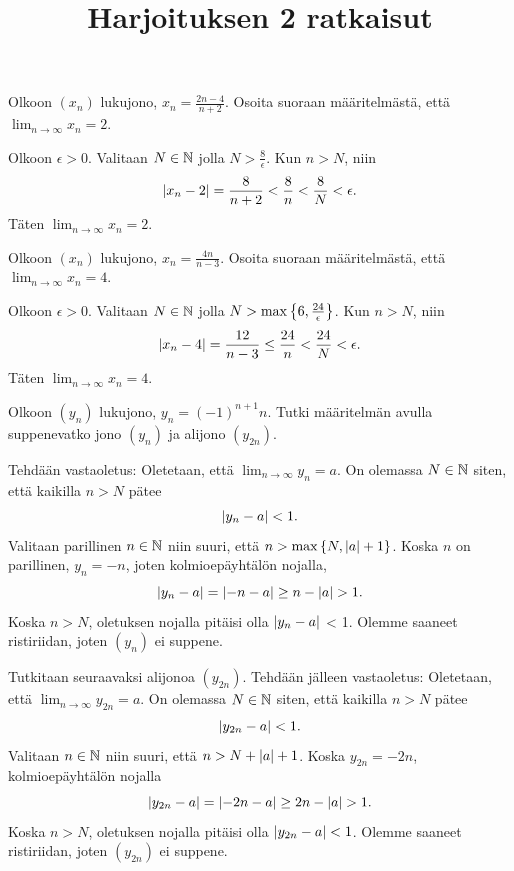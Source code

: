 \documentclass[12pt,a4paper]{article}
\title{Harjoituksen 2 ratkaisut}
\author{}
\date{}
\begin{document}
\maketitle

\noindent

\begin{exercise}
  Olkoon \((x_n)\) lukujono, \(x_n = \frac{2n - 4}{n + 2}\). Osoita suoraan
  määritelmästä, että \(\lim_{n \to \infty} x_n = 2\).
\end{exercise}

\begin{solution}
  Olkoon \(\epsilon > 0\). Valitaan \(N \in \mathbb{N}\) jolla \(N >
  \frac{8}{\epsilon}\). Kun \(n > N\), niin
  \[
    \lvert x_n - 2\rvert = \frac{8}{n + 2} < \frac{8}{n} < \frac{8}{N} < \epsilon.
  \]
  Täten \(\lim_{n \to \infty} x_n = 2\).
\end{solution}

\begin{exercise}
  Olkoon \((x_n)\) lukujono, \(x_n = \frac{4n}{n - 3}\). Osoita suoraan
  määritelmästä, että \(\lim_{n \to \infty} x_n = 4\).
\end{exercise}

\begin{solution}
  Olkoon \(\epsilon > 0\). Valitaan \(N \in \mathbb{N}\) jolla \(N >
  \max\left\lbrace6, \frac{24}{\epsilon}\right\rbrace\). Kun \(n > N\), niin
  \[
    \lvert x_n - 4\rvert = \frac{12}{n - 3} \leq \frac{24}{n} < \frac{24}{N}
    < \epsilon.
  \]
  Täten \(\lim_{n \to \infty} x_n = 4\).
\end{solution}

\begin{exercise}
  Olkoon \((y_n)\) lukujono, \(y_n = (-1)^{n + 1}n\). Tutki määritelmän
  avulla suppenevatko jono \((y_n)\) ja alijono \((y_{2n})\).
\end{exercise}

\begin{solution}
  Tehdään vastaoletus: Oletetaan, että \(\lim_{n \to \infty} y_n = a\).
  On olemassa \(N \in \mathbb{N}\) siten, että kaikilla \(n > N\) pätee
  \[
    \lvert y_n - a\rvert < 1.
  \]
  Valitaan parillinen \(n \in \mathbb{N}\) niin suuri, että \(n > \max\left\lbrace N,
  \lvert a\rvert + 1\right\rbrace\).
  Koska \(n\) on parillinen, \(y_n = -n\), joten kolmioepäyhtälön nojalla,
  \[
    \lvert y_n - a\rvert = \lvert-n - a\rvert \geq n - \lvert a\rvert > 1.
  \]
  Koska \(n > N\), oletuksen nojalla pitäisi olla \(\lvert y_{n} - a\rvert\) < 1.
  Olemme saaneet ristiriidan, joten \((y_n)\) ei suppene.

  Tutkitaan seuraavaksi alijonoa \((y_{2n})\). Tehdään jälleen vastaoletus:
  Oletetaan, että \(\lim_{n \to \infty} y_{2n} = a\). On olemassa
  \(N \in \mathbb{N}\) siten, että kaikilla \(n > N\) pätee
  \[
    \lvert y_{2n} - a\rvert < 1.
  \]
  Valitaan \(n \in \mathbb{N}\) niin suuri, että \(n > N + \lvert a\rvert + 1\).
  Koska \(y_{2n} = -2n\), kolmioepäyhtälön nojalla
  \[
    \lvert y_{2n} - a\rvert = \lvert-2n - a\rvert \geq 2n - \lvert a\rvert > 1.
  \]
  Koska \(n > N\), oletuksen nojalla pitäisi olla \(\lvert y_{2n} - a\rvert < 1\).
  Olemme saaneet ristiriidan, joten \((y_{2n})\) ei suppene.
\end{solution}
\end{document}
